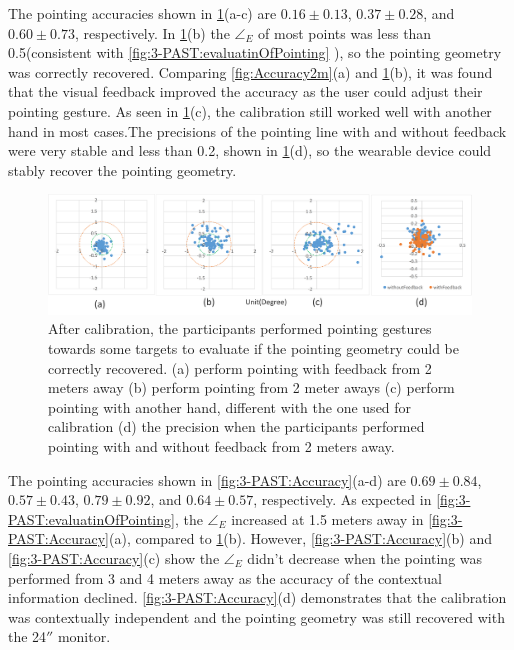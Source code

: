 The pointing accuracies shown in \figurename{ \ref{fig:3-PAST:Accuracy2m}(a-c)} are $0.16\pm0.13$\degree, $0.37\pm0.28$\degree, and $0.60\pm0.73$\degree, respectively.  In \figurename{ \ref{fig:3-PAST:Accuracy2m}(b)} the ${\angle}_{E}$ of most points was less than 0.5\degree (consistent with  \figurename{ \ref{fig:3-PAST:evaluatinOfPointing}} ), so the pointing geometry was correctly recovered. Comparing \figurename{ \ref{fig:Accuracy2m}(a) and \ref{fig:3-PAST:Accuracy2m}(b)}, it was found that the visual feedback improved the accuracy as the user could adjust their pointing gesture. As seen in \figurename{ \ref{fig:3-PAST:Accuracy2m}(c)}, the calibration still worked well with another hand in most cases.The precisions of the pointing line with and without feedback were very stable and less than 0.2\degree, shown in \figurename{ \ref{fig:3-PAST:Accuracy2m}(d)}, so the wearable device could stably recover the pointing geometry.
\begin{figure} [htb]
	\centering
	\includegraphics[width=\linewidth]{figures/3-PAST/accuracy2m.png}
	\caption{After calibration, the participants performed pointing gestures towards some targets to evaluate if the pointing geometry could be correctly recovered. (a) perform pointing with feedback from 2 meters away (b) perform pointing from 2 meter aways (c) perform pointing with another hand, different with the one used for calibration (d) the precision when the participants performed pointing with and without feedback from 2 meters away.}
	\label{fig:3-PAST:Accuracy2m}
\end{figure}

The pointing accuracies shown in \figurename{ \ref{fig:3-PAST:Accuracy}(a-d)} are $0.69\pm0.84$\degree, $0.57\pm0.43$\degree, $0.79\pm0.92$\degree, and $0.64\pm0.57$\degree, respectively. As expected in \figurename{ \ref{fig:3-PAST:evaluatinOfPointing}}, the ${\angle}_{E}$ increased at 1.5 meters away in \figurename{ \ref{fig:3-PAST:Accuracy}(a)}, compared to \figurename{ \ref{fig:3-PAST:Accuracy2m}(b)}. However, \figurename{ \ref{fig:3-PAST:Accuracy}(b) and \ref{fig:3-PAST:Accuracy}(c)} show the ${\angle}_{E}$ didn't decrease when the pointing was performed from 3 and 4 meters away as the accuracy of the contextual information declined. \figurename{ \ref{fig:3-PAST:Accuracy}(d)} demonstrates that the calibration was contextually independent and the pointing geometry was still recovered with the 24$''$ monitor. 

